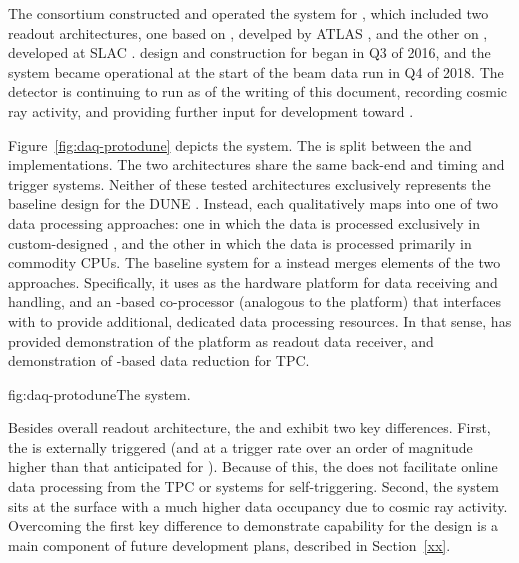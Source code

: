 The   consortium constructed and operated the  system for
, which included %
two  readout 
architectures, one based on , develped by ATLAS \cite{xx}, and the other on , developed at
SLAC \cite{xx}.  design and construction for
 began in Q3 of 2016, and the system became operational at the start of the beam data run %
in Q4 of 2018. The detector is
continuing to run as of the writing of this document, recording cosmic
ray activity, and %
providing further input for  development toward
. 

Figure~\ref{fig:daq-protodune} depicts the   system.  The  is split %
between the    and  implementations. The two architectures share the same back-end and
timing and trigger systems. 
Neither of these tested %
architectures %
exclusively represents the
baseline design for the DUNE . Instead, each %
qualitatively maps into one of
two data processing approaches: one in which the data is processed
exclusively in
custom-designed , and the other  in which the data is processed primarily in commodity
CPUs. The baseline system for a %
 instead
merges elements of the two approaches. Specifically, it uses    as
the hardware platform for data receiving and handling, and an
-based co-processor (analogous to the  platform) that
interfaces with    to provide additional, dedicated data processing
resources. In that sense, has provided demonstration of the
   platform as  readout data receiver, and
demonstration of -based data reduction for TPC.

\begin{dunefigure}{fig:daq-protodune}{The   system.}
\end{dunefigure}

Besides overall readout architecture,
the  and
  exhibit two key differences. 
First, the   is externally
triggered (and at a trigger rate 
over an order of
magnitude higher than that anticipated for ). Because of
this, the
  
does not facilitate online data
processing from the TPC or  systems for self-triggering. 
Second, the  
system sits at the surface with a much higher
data occupancy 
due to cosmic ray activity.
Overcoming the first key difference to demonstrate  capability for the   design is a main component of future  development plans, described in Section~\ref{xx}.

